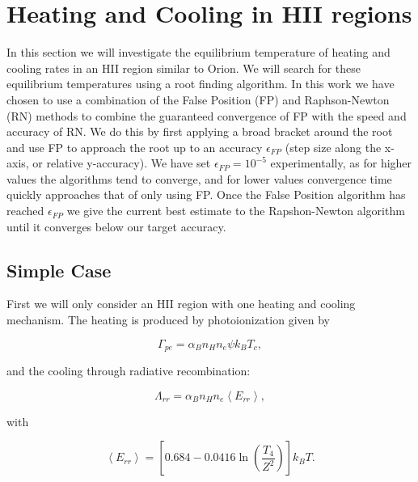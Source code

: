\section{Heating and Cooling in HII regions}




In this section we will investigate the equilibrium temperature of heating and cooling rates in an HII region similar to Orion. We will search for these equilibrium temperatures using a root finding algorithm. In this work we have chosen to use a combination of the False Position (FP) and Raphson-Newton (RN) methods to combine the guaranteed convergence of FP with the speed and accuracy of RN. We do this by first applying a broad bracket around the root and use FP to approach the root up to an accuracy $\epsilon_{FP}$ (step size along the x-axis, or relative y-accuracy). We have set $\epsilon_{FP} = 10^{-5}$ experimentally, as for higher values the algorithms tend to converge, and for lower values convergence time quickly approaches that of only using FP. Once the False Position algorithm has reached $\epsilon_{FP}$ we give the current best estimate to the Rapshon-Newton algorithm until it converges below our target accuracy.

\subsection{Simple Case}

First we will only consider an HII region with one heating and cooling mechanism. The heating is produced by photoionization given by

\begin{equation}
    \Gamma_{pe} = \alpha_B n_H n_e \psi k_B T_c,\label{eq:gamma_pe}
\end{equation}

and the cooling through radiative recombination:

\begin{equation}
    \Lambda_{rr} = \alpha_Bn_Hn_e\left<E_{rr}\right>,\label{eq:lamda_rr}
\end{equation}

with

\begin{equation}
    \left<E_{rr}\right> = \left[0.684 - 0.0416\ln\left(\frac{T_4}{Z^2}\right)\right]k_BT.
\end{equation}


